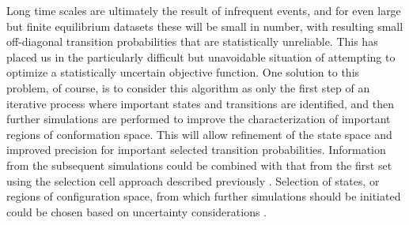 Long time scales are ultimately the result of infrequent events, and for even large but finite equilibrium datasets these will be small in number, with resulting small off-diagonal transition probabilities that are statistically unreliable.  
This has placed us in the particularly difficult but unavoidable situation of attempting to optimize a statistically uncertain objective function.
One solution to this problem, of course, is to consider this algorithm as only the first step of an iterative process where important states and transitions are identified, and then further simulations are performed to improve the characterization
of important regions of conformation space.  This will allow refinement of the state space
and improved precision for important selected transition probabilities.  Information
from the subsequent simulations could be combined with that from the first set using the 
selection cell approach described previously \cite{swope:2004a}.  
Selection of states, or regions of configuration space, from which further simulations should be initiated could be chosen based on uncertainty considerations \cite{singhal:2005a}.









